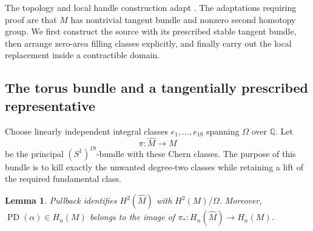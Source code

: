 \documentclass[11pt]{article}
\numberwithin{equation}{section}
\newtheorem{lemma}[theorem]{Lemma}
\theoremstyle{definition}
\theoremstyle{remark}
\newcommand{\Q}{\mathbb Q}
\newcommand{\PD}{\operatorname{PD}}
\begin{document}
The topology and local handle construction adapt
\cite[Lemmas~3.3--3.6]{W}.  The adaptations requiring proof are that $M$
has nontrivial tangent bundle and nonzero second homotopy group.  We first
construct the source with its prescribed stable tangent bundle, then
arrange zero-area filling classes explicitly, and finally carry out the
local replacement inside a contractible domain.

\subsection{The torus bundle and a tangentially prescribed representative}

Choose linearly independent integral classes $e_1,\ldots,e_{19}$ spanning
$\Omega$ over $\Q$.  Let
\[
                  \pi:\widehat M\longrightarrow M
\]
be the principal $(S^1)^{19}$-bundle with these Chern classes.  The purpose
of this bundle is to kill exactly the unwanted degree-two classes while
retaining a lift of the required fundamental class.

\begin{lemma}\label{top:lem:bundle}
Pullback identifies $H^2(\widehat M)$ with $H^2(M)/\Omega$.  Moreover,
$\PD(\alpha)\in H_n(M)$ belongs to the image of
$\pi_*:H_n(\widehat M)\to H_n(M)$.
\end{lemma}
\end{document}
